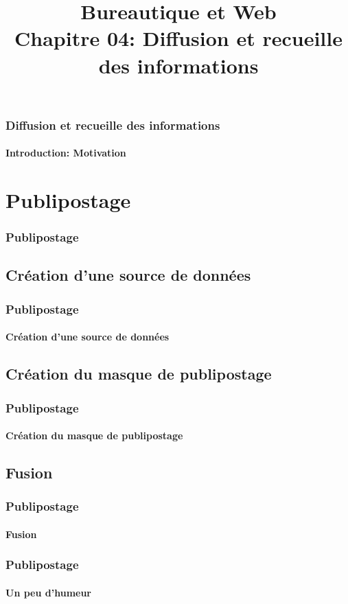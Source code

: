 \documentclass[xcolor=table]{beamer}
\title[BWEB: 03- Diffusion et recueille] %
{Bureautique et Web \\Chapitre 04: Diffusion et recueille des informations}
\begin{document}
\begin{frame}
\frametitle{Diffusion et recueille des informations}
\framesubtitle{Introduction: Motivation}


\end{frame}

\section{Publipostage}

\begin{frame}
\frametitle{Publipostage}

\end{frame}

\subsection{Création d'une source de données}

\begin{frame}
\frametitle{Publipostage}
\framesubtitle{Création d'une source de données}

\end{frame}

\subsection{Création du masque de publipostage}

\begin{frame}
\frametitle{Publipostage}
\framesubtitle{Création du masque de publipostage}

\end{frame}

\subsection{Fusion}

\begin{frame}
\frametitle{Publipostage}
\framesubtitle{Fusion}

\end{frame}

\begin{frame}
\frametitle{Publipostage}
\framesubtitle{Un peu d'humeur}
\begin{center}
\end{center}
\end{frame}
\end{document}
